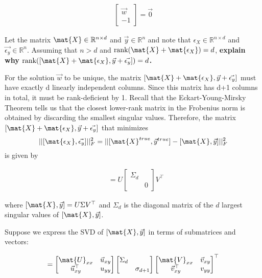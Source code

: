 \documentclass[preview]{standalone}
\begin{document}
\begin{align}
	[\mat{X}+\mat{\epsilon_X},\vec{y}+\vec{\epsilon_y}]\begin{bmatrix}\vec{w}\\-1\end{bmatrix}=\vec{0}
	\label{eq:tls}
\end{align}

\begin{Parts}
	
	\Part Let the matrix $\mat{X}\in\mathbb{R}^{n\times d}$ and $\vec{y}\in\mathbb{R}^n$ and note that $\epsilon_{X}\in\mathbb{R}^{n\times d}$ and $\vec{\epsilon_y}\in\mathbb{R}^n$.  Assuming that $n>d$ and $\text{rank}(\mat{X}+\mat{\epsilon_X})=d$, \textbf{explain why  $\text{rank}([\mat{X}+\mat{\epsilon_X},\vec{y}+\vec{\epsilon_y}])=d$.}
	
	
	
	
	\Part For the solution $\vec{w}$ to be unique, the matrix $[\mat{X}+\mat{\epsilon_X},\vec{y}+\vec{\epsilon_y}]$ must have exactly d linearly independent columns. Since this matrix has d+1 columns in total, it must be rank-deficient by 1. Recall that the Eckart-Young-Mirsky Theorem tells us that the closest lower-rank matrix in the Frobenius norm is obtained by discarding the smallest singular values. Therefore, the matrix $[\mat{X}+\mat{\epsilon_X},\vec{y}+\vec{\epsilon_y}]$ that minimizes $$\lvert\lvert[\mat{\epsilon_X},\vec{\epsilon_y}]\rvert\rvert^2_F = \lvert\lvert[\mat{X}^{true},\vec{y}^{true}] - [\mat{X},\vec{y}] \rvert\rvert^2_F$$ is given by
	
		
	\begin{align*}
		[\mat{X}+\mat{\epsilon_X},\vec{y}+\vec{\epsilon_y}]&=U
		\begin{bmatrix}
			\Sigma_{d}&\\&0
		\end{bmatrix}
		V^\top
	\end{align*}
	
	where $ [\mat{X},\vec{y}]=U\Sigma V^\top$ and $\Sigma_{d}$ is the diagonal matrix of the $d$ largest singular values of $[\mat{X},\vec{y}]$.  
	
	Suppose we express the SVD of $[\mat{X},\vec{y}]$ in terms of submatrices and vectors:
	
	\begin{align*}
		[\mat{X},\vec{y}] = \begin{bmatrix}\mat{U}_{xx}&\vec{u}_{xy}\\\vec{u}_{xy}^\top&u_{yy}\end{bmatrix}\begin{bmatrix}\Sigma_{d}&\\&\sigma_{d+1}\end{bmatrix}\begin{bmatrix}\mat{V}_{xx}&\vec{v}_{xy}\\\vec{v}_{xy}^\top&v_{yy}\end{bmatrix}^\top
	\end{align*}
	

\end{Parts}
\end{document}
